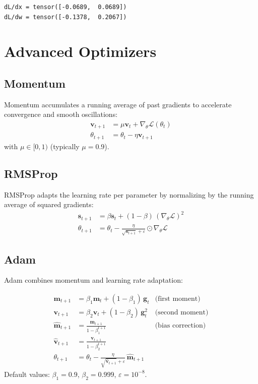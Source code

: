 \begin{codeoutput}
\begin{verbatim}
dL/dx = tensor([-0.0689,  0.0689])
dL/dw = tensor([-0.1378,  0.2067])
\end{verbatim}
\end{codeoutput}

\section{Advanced Optimizers}
\label{sec:optimizers}

\subsection{Momentum}

Momentum accumulates a running average of past gradients to accelerate convergence and smooth oscillations:
\begin{align*}
\bm{v}_{t+1} &= \mu \bm{v}_t + \nabla_\theta \mathcal{L}(\theta_t) \\
\theta_{t+1} &= \theta_t - \eta \bm{v}_{t+1}
\end{align*}
with $\mu \in [0,1)$ (typically $\mu = 0.9$).

\subsection{RMSProp}

RMSProp adapts the learning rate per parameter by normalizing by the running average of squared gradients:
\begin{align*}
\bm{s}_{t+1} &= \beta \bm{s}_t + (1-\beta)\,(\nabla_\theta \mathcal{L})^2 \\
\theta_{t+1} &= \theta_t - \frac{\eta}{\sqrt{\bm{s}_{t+1}} + \varepsilon} \odot \nabla_\theta \mathcal{L}
\end{align*}

\subsection{Adam}

Adam\cite{kingmaadam} combines momentum and learning rate adaptation:

\begin{mathbox}[title=\textbf{Adam Algorithm}]
\begin{align*}
\bm{m}_{t+1} &= \beta_1 \bm{m}_t + (1-\beta_1)\,\bm{g}_t & \text{(first moment)} \\
\bm{v}_{t+1} &= \beta_2 \bm{v}_t + (1-\beta_2)\,\bm{g}_t^2 & \text{(second moment)} \\
\hat{\bm{m}}_{t+1} &= \frac{\bm{m}_{t+1}}{1 - \beta_1^{t+1}} & \text{(bias correction)} \\
\hat{\bm{v}}_{t+1} &= \frac{\bm{v}_{t+1}}{1 - \beta_2^{t+1}} & \\
\theta_{t+1} &= \theta_t - \frac{\eta}{\sqrt{\hat{\bm{v}}_{t+1}} + \varepsilon}\,\hat{\bm{m}}_{t+1}
\end{align*}
Default values: $\beta_1 = 0.9$, $\beta_2 = 0.999$, $\varepsilon = 10^{-8}$.
\end{mathbox}

